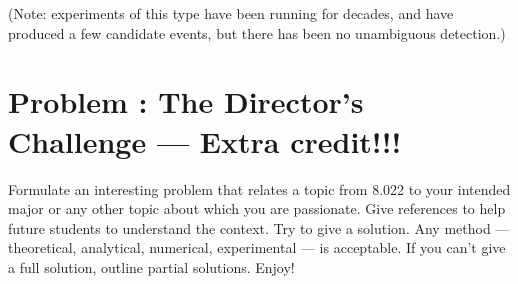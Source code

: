 \documentclass[problems]{esg8022pset}
\begin{document}
  \noindent (Note: experiments of this type have been running for decades, and have produced a few candidate events, but there has been no unambiguous detection.)
\section{Problem \thesection: The Director's Challenge --- Extra credit!!!}
  Formulate an interesting problem that relates a topic from 8.022 to your
  intended major or any other topic about which you are passionate.  Give references
  to help future students to understand the context.  Try to give a solution.
  Any method --- theoretical, analytical, numerical, experimental --- is acceptable.
  If you can't give a full solution, outline partial solutions. Enjoy!
\end{document}
